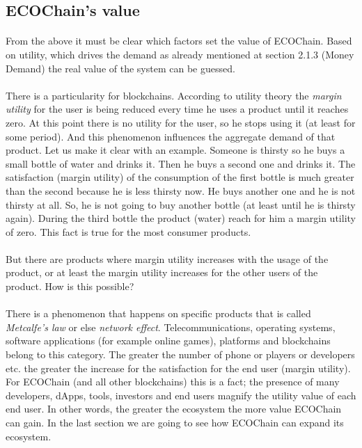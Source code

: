 \documentclass{article}
\begin{document}
\subsection{ECOChain's value}
\paragraph{}
From the above it must be clear which factors set the value of ECOChain. Based on utility, which drives the demand as already mentioned at section 2.1.3 (Money Demand) the real value of the system can be guessed. 
\paragraph{}
There is a particularity for blockchains. According to utility theory the \emph{margin utility} for the user is being reduced every time he uses a product until it reaches zero. At this point there is no utility for the user, so he stops using it (at least for some period). And this phenomenon influences the aggregate demand of that product. Let us make it clear with an example. Someone is thirsty so he buys a small bottle of water and drinks it. Then he buys a second one and drinks it. The satisfaction (margin utility) of the consumption of the first bottle is much greater than the second because he is less thirsty now. He buys another one and he is not thirsty at all. So, he is not going to buy another bottle (at least until he is thirsty again). During the third bottle the product (water) reach for him a margin utility of zero. This fact is true for the most consumer products.
\paragraph{}
But there are products where margin utility increases with the usage of the product, or at least the margin utility increases for the other users of the product. How is this possible?
\paragraph{}
There is a phenomenon that happens on specific products that is called \emph{ Metcalfe's law} or else \emph{network effect}. Telecommunications, operating systems, software applications (for example online games), platforms and blockchains belong to this category. The greater the number of phone or players or developers etc. the greater the increase for the satisfaction for the end user (margin utility). For ECOChain (and all other blockchains) this is a fact; the presence of many developers, dApps, tools, investors and end users magnify the utility value of each end user. In other words, the greater the ecosystem the more value ECOChain can gain. In the last section we are going to see how ECOChain can expand its ecosystem.
\end{document}
